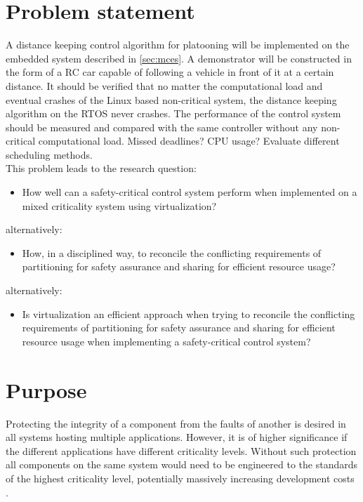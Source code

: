 \section{Problem statement}
\label{sec:problem}
A distance keeping control algorithm for platooning will be implemented on the embedded system described in \ref{sec:mces}. A demonstrator will be constructed in the form of a RC car capable of following a vehicle in front of it at a certain distance. It should be verified that no matter the computational load and eventual crashes of the Linux based non-critical system, the distance keeping algorithm on the RTOS never crashes. The performance of the control system should be measured and compared with the same controller without any non-critical computational load. Missed deadlines? CPU usage? Evaluate different scheduling methods.\\

This problem leads to the research question: 
\begin{itemize}
\item How well can a safety-critical control system perform when implemented on a mixed criticality system using virtualization?
\end{itemize}
alternatively:
\begin{itemize}
\item How, in a disciplined way, to reconcile the conflicting requirements of partitioning for safety assurance and sharing for efficient resource usage? \cite{burns2016}
\end{itemize}
alternatively:
\begin{itemize}
\item Is virtualization an efficient approach when trying to reconcile the conflicting requirements of partitioning for safety assurance and sharing for efficient resource usage when implementing a safety-critical control system?
\end{itemize}

\section{Purpose}
Protecting the integrity of a component from the faults of another is desired in all systems hosting multiple applications. However, it is of higher significance if the different applications have different criticality levels. Without such protection all components on the same system would need to be engineered to the standards of the highest criticality level, potentially massively increasing development costs \cite{burns2016}.

